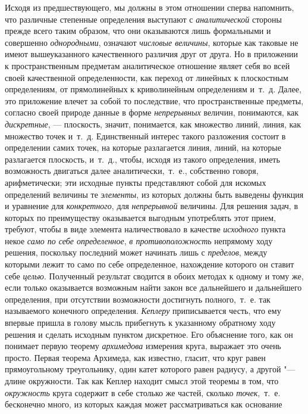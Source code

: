 Исходя из предшествующего, мы должны в этом отношении сперва напомнить, что
различные степенные определения выступают с
{\em аналитической} стороны прежде всего таким образом,
что они оказываются лишь формальными и совершенно
{\em однородными}, означают
{\em числовые величины}, которые как таковые не имеют
вышеуказанного качественного различия друг от друга. Но в приложении к
пространственным предметам аналитическое отношение являет себя во всей
своей качественной определенности, как переход от линейных к плоскостным
определениям, от прямолинейных к криволинейным определениям и~т.~д. Далее,
это приложение влечет за собой то последствие, что пространственные
предметы, согласно своей природе данные в форме
{\em непрерывных} величин, понимаются, как
{\em дискретные}, — плоскость, значит, понимается, как
множество линий, линия, как множество точек и~т.~д. Единственный интерес
такого разложения состоит в определении самих точек, на которые разлагается
линия, линий, на которые разлагается плоскость, и~т.~д., чтобы, исходя из
такого определения, иметь возможность двигаться далее аналитически,~т.~е.,
собственно говоря, арифметически; эти исходные пункты представляют собой
для искомых определений величины те {\em элементы}, из
которых должны быть выведены функция и уравнение для
{\em конкретного}, для
{\em непрерывной} величины. Для решения задач, в
которых по преимуществу оказывается выгодным употреблять этот прием,
требуют, чтобы в виде элемента наличествовало в качестве
{\em исходного} пункта некое
{\em само по себе определенное},
{\em в противоположность} непрямому ходу решения,
поскольку последний может начинать лишь с
{\em пределов}, между которыми лежит то само по себе
определенное, нахождение которого он ставит себе
{\em целью}. Полученный результат сводится в обоих
методах к одному и тому же, если только оказывается возможным найти закон
все дальнейшего и дальнейшего определения, при отсутствии возможности
достигнуть полного,~т.~е. так называемого конечного определения.
{\em Кеплеру} приписывается честь, что ему впервые
пришла в голову мысль прибегнуть к указанному обратному ходу решения и
сделать исходным пунктом дискретное. Его объяснение того, как он понимает
первую теорему {\em архимедова} измерения круга,
выражает это очень просто. Первая теорема Архимеда, как известно, гласит,
что круг равен прямоугольному треугольнику, один катет которого равен
радиусу, а другой "--- длине окружности. Так как Кеплер находит смысл этой
теоремы в том, что {\em окружность} круга содержит в
себе столько же частей, сколько {\em точек},~т.~е.
бесконечно много, из которых каждая может рассматриваться как основание
